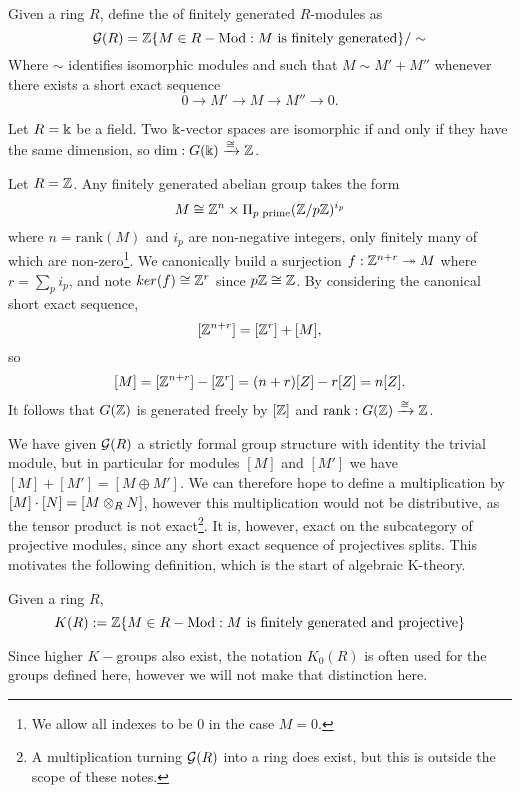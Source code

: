 \begin{definition}Given a ring $R$, define the  of finitely generated $R$-modules as 
$$\mathcal{G} (R)=\mathbb{Z}\{M\in R-\text{Mod} : M \text{ is finitely generated}\}/\sim$$
Where $\sim$ identifies isomorphic modules and such that $M\sim M'+M''$ whenever there exists a short exact sequence
$$0\rightarrow M'\rightarrow M\rightarrow M''\rightarrow 0.$$\end{definition}

\begin{example}
Let $R=\Bbbk$ be a field. Two $\Bbbk$-vector spaces are isomorphic if and only if they have the same dimension, so $\text{dim}:G(\Bbbk)\xrightarrow{\cong} \mathbb{Z}$. 
\end{example}\begin{example}
Let $R=\mathbb{Z}$. Any finitely generated abelian group takes the form $$M\cong \mathbb{Z}^{n}\times \Pi_{p \text{ prime}}(\mathbb{Z}/p\mathbb{Z})^{i_p}$$ where $n=\text{rank}(M)$ and $i_p$ are non-negative integers, only finitely many of which are non-zero\footnote{We allow all indexes to be $0$ in the case $M=0$.}. We canonically build a surjection $f:\mathbb{Z}^{n+r}\twoheadrightarrow M$ where $r=\sum_p i_p$, and note $ker(f)\cong \mathbb{Z}^r$ since $p\mathbb{Z}\cong \mathbb{Z}$. By considering the canonical short exact sequence, $$[\mathbb{Z}^{n+r}]=[\mathbb{Z}^r]+[M],$$ so $$[M]=[\mathbb{Z}^{n+r}]-[\mathbb{Z}^r]=(n+r)[Z]-r[Z]=n[Z].$$ It follows that $G(\mathbb{Z})$ is generated freely by $[\mathbb{Z}]$ and $\text{rank}:G(\mathbb{Z})\xrightarrow{\cong} \mathbb{Z}$. 
\end{example}

We have given $\mathcal{G}(R)$ a strictly formal group structure with identity the trivial module, but in particular for modules $[M]$ and $[M']$ we have $[M]+[M']=[M\oplus M']$. We can therefore hope to define a multiplication by $[M]\cdot [N]=[M\otimes_R N]$, however this multiplication would not be distributive, as the tensor product is not exact\footnote{A multiplication turning $\mathcal{G}(R)$ into a ring does exist, but this is outside the scope of these notes.}. It is, however, exact on the subcategory of projective modules, since any short exact sequence of projectives splits. This motivates the following definition, which is the start of algebraic K-theory.

\begin{definition}
Given a ring $R$, $$K(R):=\mathbb{Z}\{M\in R-\text{Mod} : M \text{ is finitely generated and projective}\}$$
\end{definition}

Since higher $K-$groups also exist, the notation $K_0(R)$ is often used for the groups defined here, however we will not make that distinction here. 

